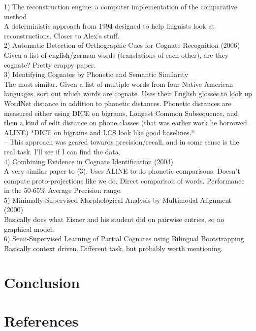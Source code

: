\documentclass[11pt,a4paper]{article}
\begin{document}
1) The reconstruction engine: a computer implementation of the
comparative method\\
  A deterministic approach from 1994 designed to help linguists look
at reconstructions. Closer to Alex's stuff. \\
2) Automatic Detection of Orthographic Cues for Cognate Recognition (2006) \\
  Given a list of english/german words (translations of each other),
are they cognate? Pretty crappy paper.\\
3) Identifying Cognates by Phonetic and Semantic Similarity \\
  The most similar. Given a list of multiple words from four Native
American languages, sort out which words are cognate. Uses their
English glosses to look up WordNet distance in addition to phonetic
distances. Phonetic distances are measured either using DICE on
bigrams, Longest Common Subsequence, and then a kind of edit distance
on phone classes (that was earlier work he borrowed. ALINE) *DICE on
bigrams and LCS look like good baselines.*\\
  -- This approach was geared towards precision/recall, and in some
sense is the real task. I'll see if I can find the data. \\
4)  Combining Evidence in Cognate Identification (2004) \\
  A very similar paper to (3). Uses ALINE to do phonetic comparisons.
Doesn't compute proto-projections like we do. Direct comparison of
words. Performance in the 50-65\% Average Precision range.\\
5) Minimally Supervised Morphological Analysis by Multimodal Alignment (2000) \\
  Basically does what Eisner and his student did on pairwise entries,
so no graphical model.\\
6) Semi-Supervised Learning of Partial Cognates using Bilingual Bootstrapping
  Basically context driven. Different task, but probably worth mentioning.

\section{Conclusion}
\section*{References}


\end{document}
